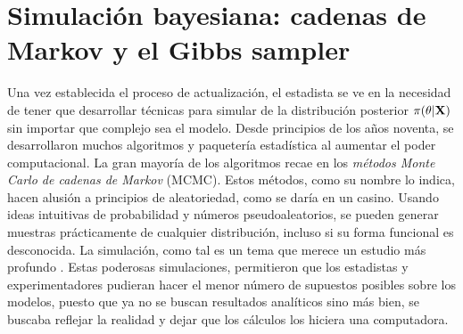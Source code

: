 \documentclass[../Main/Main.tex]{subfiles}
\begin{document}
\section{Simulación bayesiana: cadenas de Markov y el Gibbs sampler} \label{sec:GibbsSampler}
Una vez establecida el proceso de actualización, el estadista se ve en la necesidad de tener que desarrollar técnicas para simular de la distribución posterior $\pi(\theta|\mathbf{X})$ sin importar que complejo sea el modelo. Desde principios de los años noventa, se desarrollaron muchos algoritmos y paquetería estadística al aumentar el poder computacional.  La gran mayoría de los algoritmos recae en los \textit{métodos Monte Carlo de cadenas de Markov} (MCMC). Estos métodos, como su nombre lo indica, hacen alusión a principios de aleatoriedad, como se daría en un casino. Usando ideas intuitivas de probabilidad y números pseudoaleatorios, se pueden generar muestras prácticamente de cualquier distribución, incluso si su forma funcional es desconocida. La simulación, como tal es un tema que merece un estudio más profundo \autocite{robert2004monte}. Estas poderosas simulaciones, permitieron  que los estadistas y experimentadores pudieran hacer el menor número de supuestos posibles sobre los modelos, puesto que ya no se buscan resultados analíticos sino más bien, se buscaba reflejar la realidad y dejar que los cálculos los hiciera una computadora.\\
\end{document}
